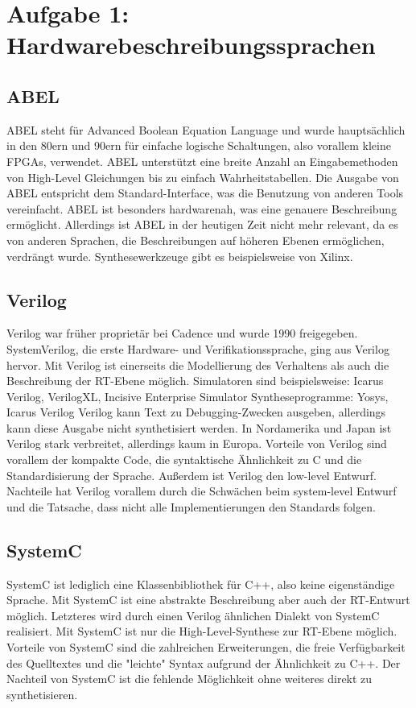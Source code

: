 \documentclass[parskip=full]{scrartcl}
\begin{document}
	\setcounter{section}{1}
	\section*{Aufgabe 1: Hardwarebeschreibungssprachen}
		\subsection{ABEL}
			ABEL steht für Advanced Boolean Equation Language und wurde hauptsächlich in den 80ern und 90ern für einfache logische Schaltungen, also vorallem kleine FPGAs, verwendet. ABEL unterstützt eine breite Anzahl an Eingabemethoden von High-Level Gleichungen bis zu einfach Wahrheitstabellen. 
			Die Ausgabe von ABEL entspricht dem Standard-Interface, was die Benutzung von anderen Tools vereinfacht. ABEL ist besonders hardwarenah, was eine genauere Beschreibung ermöglicht.
			Allerdings ist ABEL in der heutigen Zeit nicht mehr relevant, da es von anderen Sprachen, die Beschreibungen auf höheren Ebenen ermöglichen, verdrängt wurde.
			Synthesewerkzeuge gibt es beispielsweise von Xilinx.
			
		\subsection{Verilog}
			Verilog war früher proprietär bei Cadence und wurde 1990 freigegeben. SystemVerilog, die erste Hardware- und Verifikationssprache, ging aus Verilog hervor. Mit Verilog ist einerseits die Modellierung des Verhaltens als auch die Beschreibung der RT-Ebene möglich.
			Simulatoren sind beispielsweise: Icarus Verilog, VerilogXL, Incisive Enterprise Simulator
			Syntheseprogramme: Yosys, Icarus Verilog
			Verilog kann Text zu Debugging-Zwecken ausgeben, allerdings kann diese Ausgabe nicht synthetisiert werden. In Nordamerika und Japan ist Verilog stark verbreitet, allerdings kaum in Europa.
			Vorteile von Verilog sind vorallem der kompakte Code, die syntaktische Ähnlichkeit zu C und die Standardisierung der Sprache. Außerdem ist Verilog den low-level Entwurf.
			Nachteile hat Verilog vorallem durch die Schwächen beim system-level Entwurf und die Tatsache, dass nicht alle Implementierungen den Standards folgen.
		
		\subsection{SystemC}
			SystemC ist lediglich eine Klassenbibliothek für C++, also keine eigenständige Sprache. Mit SystemC ist eine abstrakte Beschreibung aber auch der RT-Entwurt möglich. Letzteres wird durch einen Verilog ähnlichen Dialekt von SystemC realisiert. Mit SystemC ist nur die High-Level-Synthese zur RT-Ebene möglich.
			Vorteile von SystemC sind die zahlreichen Erweiterungen, die freie Verfügbarkeit des Quelltextes und die "leichte" Syntax aufgrund der Ähnlichkeit zu C++.
			Der Nachteil von SystemC ist die fehlende Möglichkeit ohne weiteres direkt zu synthetisieren.
		
\end{document}
